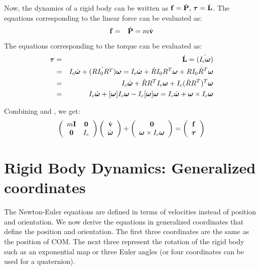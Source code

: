 Now, the dynamics of a rigid body can be written as $\mathbf{f} = \dot{\mathbf{P}} \mbox{,\ } \bm{\tau} = \dot{\mathbf{L}}$. The equations corresponding to the linear force can be evaluated as:
\begin{eqnarray}
\label{eq:force}
\mathbf{f} & = & \dot{\mathbf{P}} = m \dot{\mathbf{v}}
\end{eqnarray}
The equations corresponding to the torque can be evaluated as:
\begin{eqnarray}
\label{eq:torque}
\nonumber
\bm{\tau} & = & \dot{\mathbf{L}} = \dot{(I_c \bm{\omega})} \\
\nonumber
& = & I_c\dot{\bm{\omega}} + \dot{(RI_0 R^T)}\bm{\omega} = I_c\dot{\bm{\omega}} + \dot{R}I_0 R^T\bm{\omega} + R I_0 \dot{R}^T\bm{\omega}\\
\nonumber
& = & I_c\dot{\bm{\omega}} + \dot{R}R^T I_c \bm{\omega} + I_c (\dot{R}R^T)^T\bm{\omega} \\
& = & I_c\dot{\bm{\omega}} + [\bm{\omega}]I_c \bm{\omega} - I_c[\bm{\omega}]\bm{\omega} = I_c\dot{\bm{\omega}} + \bm{\omega} \times I_c \bm{\omega}
\end{eqnarray}

Combining  and , we get:
\begin{equation}
\label{eq:newtoneuler}
\left(
\begin{array}{cc}
m\mathbf{I} & \mathbf{0} \\
\mathbf{0} & I_c 
\end{array}
\right)
\left(
\begin{array}{c}
\dot{\mathbf{v}} \\
\dot{\bm{\omega}} 
\end{array}
\right) +
\left(
\begin{array}{c}
\mathbf{0}  \\
\bm{\omega} \times I_c \bm{\omega} 
\end{array}
\right) = 
\left(
\begin{array}{c}
\mathbf{f} \\
\bm{\tau} 
\end{array}
\right)
\end{equation}

\section{Rigid Body Dynamics: Generalized coordinates}
\label{sec:rigidbodydyngen}
The Newton-Euler equations are defined in terms of velocities instead of position and orientation. We now derive the equations in generalized coordinates  that define the position and orientation. The first three coordinates are the same as the position of COM. The next three represent the rotation of the rigid body such as an exponential map or three Euler angles (or four coordinates can be used for a quaternion).


